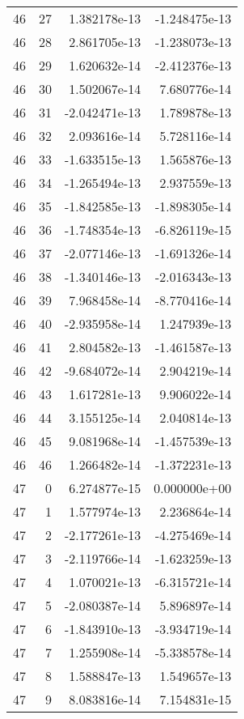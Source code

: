 \begin{tabular}{rrrr}
  46 &   27 &  1.382178e-13 & -1.248475e-13 \\
  46 &   28 &  2.861705e-13 & -1.238073e-13 \\
  46 &   29 &  1.620632e-14 & -2.412376e-13 \\
  46 &   30 &  1.502067e-14 &  7.680776e-14 \\
  46 &   31 & -2.042471e-13 &  1.789878e-13 \\
  46 &   32 &  2.093616e-14 &  5.728116e-14 \\
  46 &   33 & -1.633515e-13 &  1.565876e-13 \\
  46 &   34 & -1.265494e-13 &  2.937559e-13 \\
  46 &   35 & -1.842585e-13 & -1.898305e-14 \\
  46 &   36 & -1.748354e-13 & -6.826119e-15 \\
  46 &   37 & -2.077146e-13 & -1.691326e-14 \\
  46 &   38 & -1.340146e-13 & -2.016343e-13 \\
  46 &   39 &  7.968458e-14 & -8.770416e-14 \\
  46 &   40 & -2.935958e-14 &  1.247939e-13 \\
  46 &   41 &  2.804582e-13 & -1.461587e-13 \\
  46 &   42 & -9.684072e-14 &  2.904219e-14 \\
  46 &   43 &  1.617281e-13 &  9.906022e-14 \\
  46 &   44 &  3.155125e-14 &  2.040814e-13 \\
  46 &   45 &  9.081968e-14 & -1.457539e-13 \\
  46 &   46 &  1.266482e-14 & -1.372231e-13 \\
  47 &    0 &  6.274877e-15 &  0.000000e+00 \\
  47 &    1 &  1.577974e-13 &  2.236864e-14 \\
  47 &    2 & -2.177261e-13 & -4.275469e-14 \\
  47 &    3 & -2.119766e-14 & -1.623259e-13 \\
  47 &    4 &  1.070021e-13 & -6.315721e-14 \\
  47 &    5 & -2.080387e-14 &  5.896897e-14 \\
  47 &    6 & -1.843910e-13 & -3.934719e-14 \\
  47 &    7 &  1.255908e-14 & -5.338578e-14 \\
  47 &    8 &  1.588847e-13 &  1.549657e-13 \\
  47 &    9 &  8.083816e-14 &  7.154831e-15 \\

\end{tabular}
